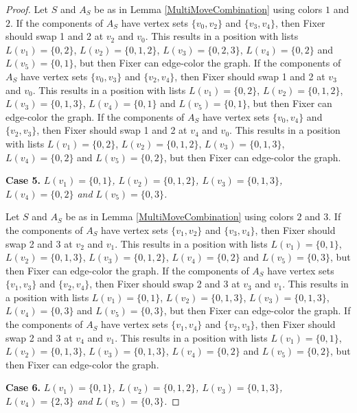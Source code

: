 \documentclass[12pt]{amsart}
\theoremstyle{plain}
\theoremstyle{definition}
\theoremstyle{remark}
\begin{document}
\begin{proof}
Let $S$ and $A_S$ be as in Lemma \ref{MultiMoveCombination} using colors $1$ and $2$. If the components of $A_S$ have vertex sets $\{v_0, v_2\}$ and $\{v_3, v_4\}$, then Fixer should swap 1 and 2 at $v_2$ and $v_0$. This results in a position with lists $L(v_1) = \{0, 2\}$, $L(v_2) = \{0, 1, 2\}$, $L(v_3) = \{0, 2, 3\}$, $L(v_4) = \{0, 2\}$ and $L(v_5) = \{0, 1\}$, but then Fixer can edge-color the graph.
If the components of $A_S$ have vertex sets $\{v_0, v_3\}$ and $\{v_2, v_4\}$, then Fixer should swap 1 and 2 at $v_3$ and $v_0$. This results in a position with lists $L(v_1) = \{0, 2\}$, $L(v_2) = \{0, 1, 2\}$, $L(v_3) = \{0, 1, 3\}$, $L(v_4) = \{0, 1\}$ and $L(v_5) = \{0, 1\}$, but then Fixer can edge-color the graph.
If the components of $A_S$ have vertex sets $\{v_0, v_4\}$ and $\{v_2, v_3\}$, then Fixer should swap 1 and 2 at $v_4$ and $v_0$. This results in a position with lists $L(v_1) = \{0, 2\}$, $L(v_2) = \{0, 1, 2\}$, $L(v_3) = \{0, 1, 3\}$, $L(v_4) = \{0, 2\}$ and $L(v_5) = \{0, 2\}$, but then Fixer can edge-color the graph.

\noindent\textbf{Case 5.  }\textit{$L(v_1) = \{0, 1\}$, $L(v_2) = \{0, 1, 2\}$, $L(v_3) = \{0, 1, 3\}$, $L(v_4) = \{0, 2\}$ and $L(v_5) = \{0, 3\}$.}

Let $S$ and $A_S$ be as in Lemma \ref{MultiMoveCombination} using colors $2$ and $3$. If the components of $A_S$ have vertex sets $\{v_1, v_2\}$ and $\{v_3, v_4\}$, then Fixer should swap 2 and 3 at $v_2$ and $v_1$. This results in a position with lists $L(v_1) = \{0, 1\}$, $L(v_2) = \{0, 1, 3\}$, $L(v_3) = \{0, 1, 2\}$, $L(v_4) = \{0, 2\}$ and $L(v_5) = \{0, 3\}$, but then Fixer can edge-color the graph.
If the components of $A_S$ have vertex sets $\{v_1, v_3\}$ and $\{v_2, v_4\}$, then Fixer should swap 2 and 3 at $v_3$ and $v_1$. This results in a position with lists $L(v_1) = \{0, 1\}$, $L(v_2) = \{0, 1, 3\}$, $L(v_3) = \{0, 1, 3\}$, $L(v_4) = \{0, 3\}$ and $L(v_5) = \{0, 3\}$, but then Fixer can edge-color the graph.
If the components of $A_S$ have vertex sets $\{v_1, v_4\}$ and $\{v_2, v_3\}$, then Fixer should swap 2 and 3 at $v_4$ and $v_1$. This results in a position with lists $L(v_1) = \{0, 1\}$, $L(v_2) = \{0, 1, 3\}$, $L(v_3) = \{0, 1, 3\}$, $L(v_4) = \{0, 2\}$ and $L(v_5) = \{0, 2\}$, but then Fixer can edge-color the graph.

\noindent\textbf{Case 6.  }\textit{$L(v_1) = \{0, 1\}$, $L(v_2) = \{0, 1, 2\}$, $L(v_3) = \{0, 1, 3\}$, $L(v_4) = \{2, 3\}$ and $L(v_5) = \{0, 3\}$.}


\end{proof}
\end{document}
